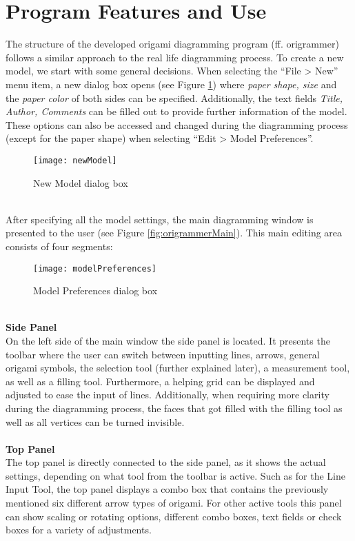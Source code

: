 
\section{Program Features and Use}
\label{program}

The structure of the developed origami diagramming program (ff. \gls{origrammer}) follows a similar approach to the real life diagramming process. To create a new model, we start with some general decisions. When selecting the ``File > New'' menu item, a new dialog box opens (see Figure \ref{fig:newModel}) where \emph{paper shape, size} and the \emph{paper color} of both sides can be specified. Additionally, the text fields \emph{Title, Author, Comments} can be filled out to provide further information of the model. These options can also be accessed and changed during the diagramming process (except for the paper shape) when selecting ``Edit > Model Preferences''.
\begin{figure}[h]
	\centering
	\texttt{[image: newModel]}
	\caption{New Model dialog box}
	\label{fig:newModel}
\end{figure}\\
After specifying all the model settings, the main diagramming window is presented to the user (see Figure \ref{fig:origrammerMain}). This main editing area consists of four segments:\\
\begin{figure}[h]
	\centering
	\texttt{[image: modelPreferences]}
	\caption{Model Preferences dialog box}
	\label{fig:modelPreferences}
\end{figure}
\\
\textbf{Side Panel}\\
On the left side of the main window the side panel is located. It presents the toolbar where the user can switch between inputting lines, arrows, general origami symbols, the selection tool (further explained later), a measurement tool, as well as a filling tool. Furthermore, a helping grid can be displayed and adjusted to ease the input of lines. Additionally, when requiring more clarity during the diagramming process, the faces that got filled with the filling tool as well as all vertices can be turned invisible.\\
\\
\textbf{Top Panel}\\
The top panel is directly connected to the side panel, as it shows the actual settings, depending on what tool from the toolbar is active. Such as for the Line Input Tool, the top panel displays a combo box that contains the previously mentioned six different arrow types of origami. For other active tools this panel can show scaling or rotating options, different combo boxes, text fields or check boxes for a variety of adjustments.\\

